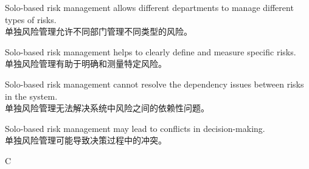 \documentclass{article}
\begin{document}
            \begin{choices}
                \item Solo-based risk management allows different departments to manage different types of risks.  \\
                单独风险管理允许不同部门管理不同类型的风险。
                \item Solo-based risk management helps to clearly define and measure specific risks.  \\
                单独风险管理有助于明确和测量特定风险。
                \item Solo-based risk management cannot resolve the dependency issues between risks in the system.  \\
                单独风险管理无法解决系统中风险之间的依赖性问题。
                \item Solo-based risk management may lead to conflicts in decision-making.  \\
                单独风险管理可能导致决策过程中的冲突。
            \end{choices}
            
            \begin{correctanswer}
            C
            \end{correctanswer}
            
\end{document}
